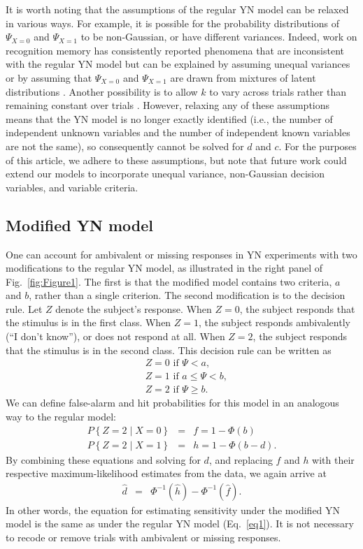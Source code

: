 \documentclass[man]{apa6}
\begin{document}
It is worth noting that the assumptions of the regular YN model can be relaxed in various ways. For example, it is possible for the probability distributions of $\Psi_{X=0}$ and $\Psi_{X=1}$ to be non-Gaussian, or have different variances. Indeed, work on recognition memory has consistently reported phenomena that are inconsistent with the regular YN model but can be explained by assuming unequal variances \parencite{Wixted2007, Yonelinas2007} or by assuming that $\Psi_{X=0}$ and $\Psi_{X=1}$ are drawn from mixtures of latent distributions \parencite{decarlosignal2002}. Another possibility is to allow $k$ to vary across trials rather than remaining constant over trials \parencite{cabreraseparating2015}. However, relaxing any of these assumptions means that the YN model is no longer exactly identified (i.e., the number of independent unknown variables and the number of independent known variables are not the same), so consequently cannot be solved for $d$ and $c$. For the purposes of this article, we adhere to these assumptions, but note that future work could extend our models to incorporate unequal variance, non-Gaussian decision variables, and variable criteria.

\subsection{Modified YN model}
One can account for ambivalent or missing responses in YN experiments with two modifications to the regular YN model, as illustrated in the right panel of Fig.~\ref{fig:Figure1}. The first is that the modified model contains two criteria, $a$ and $b$, rather than a single criterion. The second modification is to the decision rule. Let $Z$ denote the subject's response. When $Z=0$, the subject responds that the stimulus is in the first class. When $Z=1$, the subject responds ambivalently (``I don't know''), or does not respond at all. When $Z=2$, the subject responds that the stimulus is in the second class. This decision rule can be written as
\begin{eqnarray*}
&Z=0\textrm{ if }\Psi<a\textrm{,}\\
&Z=1\textrm{ if }a\le\Psi<b\textrm{,}\\
&Z=2\textrm{ if }\Psi\ge{}b\textrm{.}
\end{eqnarray*} 
We can define false-alarm and hit probabilities for this model in an analogous way to the regular model:
\begin{eqnarray*}
P\left\{Z=2\mid{}X=0\right\}&=&f=1-\Phi\left(b\right)\\
P\left\{Z=2\mid{}X=1\right\}&=&h=1-\Phi\left(b-d\right)\textrm{.}
\end{eqnarray*}
By combining these equations and solving for $d$, and replacing $f$ and $h$ with their respective maximum-likelihood estimates from the data, we again arrive at
\begin{eqnarray*}
\hat{d}&=&\Phi^{-1}\left(\hat{h}\right)-\Phi^{-1}\left(\hat{f}\right)\textrm{.}
\end{eqnarray*}In other words, the equation for estimating sensitivity under the modified YN model is the same as under the regular YN model (Eq.~\ref{eq1}). It is not necessary to recode or remove trials with ambivalent or missing responses.
\end{document}
